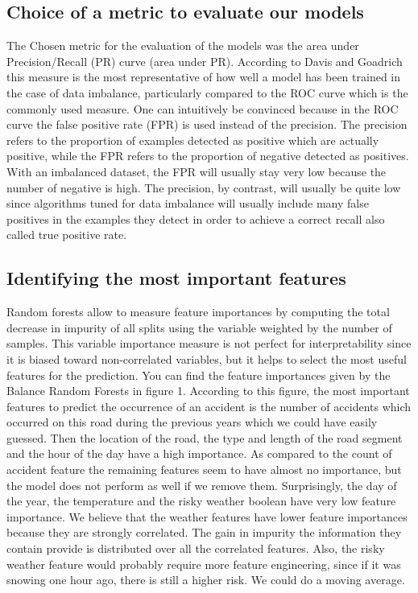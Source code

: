 \documentclass[conference]{IEEEtran}
\begin{document}
\subsection{Choice of a metric to evaluate our models}
The Chosen metric for the evaluation of the models was the area under Precision/Recall (PR) curve (area under PR). According to Davis and Goadrich\cite{Davis} this measure is the most representative of how well a model has been trained in the case of data imbalance, particularly compared to the ROC curve which is the commonly used measure. One can intuitively be convinced because in the ROC curve the false positive rate (FPR) is used instead of the precision. The precision refers to the proportion of examples detected as positive which are actually positive, while the FPR refers to the proportion of negative detected as positives. With an imbalanced dataset, the FPR will usually stay very low because the number of negative is high. The precision, by contrast, will usually be quite low since algorithms tuned for data imbalance will usually include many false positives in the examples they detect in order to achieve a correct recall also called true positive rate.

\subsection{Identifying the most important features}
Random forests allow to measure feature importances by computing the total decrease in impurity of all splits using the variable weighted by the number of samples. This variable importance measure is not perfect for interpretability since it is biased toward non-correlated variables, but it helps to select the most useful features for the prediction. You can find the feature importances given by the Balance Random Forests in figure 1. According to this figure, the most important features to predict the occurrence of an accident is the number of accidents which occurred on this road during the previous years which we could have easily guessed. Then the location of the road, the type and length of the road segment and the hour of the day have a high importance. As compared to the count of accident feature the remaining features seem to have almost no importance, but the model does not perform as well if we remove them. Surprisingly, the day of the year, the temperature and the risky weather boolean have very low feature importance. We believe that the weather features have lower feature importances because they are strongly correlated. The gain in impurity the information they contain provide is distributed over all the correlated features. Also, the risky weather feature would probably require more feature engineering, since if it was snowing one hour ago, there is still a higher risk. We could do a moving average.
\end{document}
